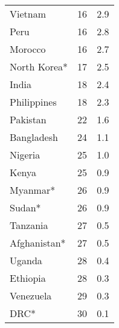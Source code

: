 \begin{longtable}[t]{lrr}
Vietnam & 16 & 2.9\\
Peru & 16 & 2.8\\
Morocco & 16 & 2.7\\
North Korea* & 17 & 2.5\\
India & 18 & 2.4\\
Philippines & 18 & 2.3\\
Pakistan & 22 & 1.6\\
Bangladesh & 24 & 1.1\\
Nigeria & 25 & 1.0\\
Kenya & 25 & 0.9\\
Myanmar* & 26 & 0.9\\
Sudan* & 26 & 0.9\\
Tanzania & 27 & 0.5\\
Afghanistan* & 27 & 0.5\\
Uganda & 28 & 0.4\\
Ethiopia & 28 & 0.3\\
Venezuela & 29 & 0.3\\
DRC* & 30 & 0.1\\
\bottomrule
\end{longtable}